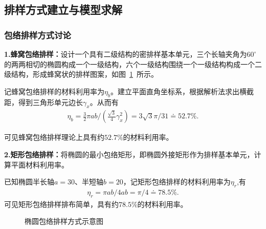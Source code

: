 \documentclass{whutmod}
\begin{document}
		\subsection{排样方式建立与模型求解}
			
		\subsubsection{包络排样方式讨论}
			\textbf{1.蜂窝包络排样：}设计一个具有二级结构的密排样基本单元，三个长轴夹角为$60^{\circ}$的两两相切的椭圆构成一个一级结构，六个一级结构围绕一个一级结构构成一个二级结构，形成蜂窝状的排样图案，如图~\ref{ccc}~所示。
			
			记蜂窝包络排样的材料利用率为$\eta_b$。建立平面直角坐标系，根据解析法求出横截距，得到三角形单元边长$\gamma_x$。从而有
			\begin{gather*}
			\eta_b=\frac{3}{2}\pi ab/\left (\frac{\sqrt{3}}{4}\gamma_x^2\right )=3\sqrt{3}\pi/31\doteq 52.7\%.
			\end{gather*}
			
			可见蜂窝包络排样理论上具有约$52.7\%$的材料利用率。
			
			
		\textbf{2.矩形包络排样：}将椭圆的最小包络矩形，即椭圆外接矩形作为排样基本单元，计算平面材料利用率。
			
			已知椭圆半长轴$a=30$、半短轴$b=20$，记矩形包络排样的材料利用率为$\eta_r$,有
			\begin{gather*}
			\eta_r=\pi ab/4ab=\pi/4\doteq 78.5\%.
			\end{gather*}
			可见矩形包络排样排布简单，具有约$78.5\%$的材料利用率。
			
			\begin{figure}[H]
				\centering
				\caption{椭圆包络排样方式示意图}\label{ccc}
			\end{figure}
			
\end{document}
